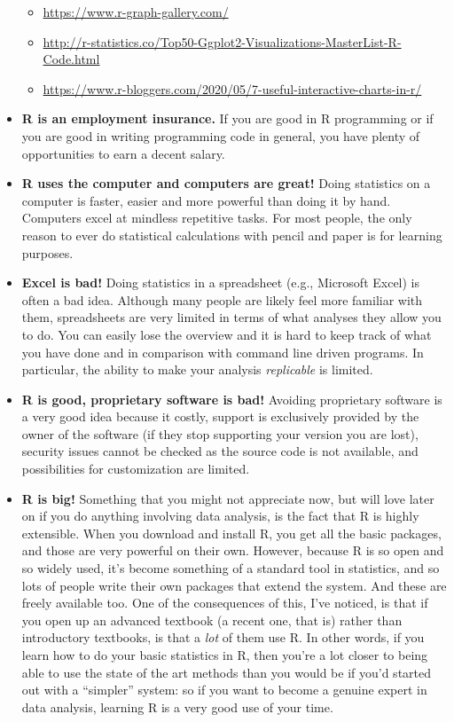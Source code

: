 \documentclass[
  12pt,
  oneside]{book}
\providecommand{\tightlist}{%
  \setlength{\itemsep}{0pt}\setlength{\parskip}{0pt}}
\theoremstyle{definition}
\theoremstyle{definition}
\theoremstyle{definition}
\theoremstyle{definition}
\theoremstyle{remark}
\begin{document}
\begin{itemize}
  \begin{itemize}
  \tightlist
  \item
    \url{https://www.r-graph-gallery.com/}
  \item
    \url{http://r-statistics.co/Top50-Ggplot2-Visualizations-MasterList-R-Code.html}
  \item
    \url{https://www.r-bloggers.com/2020/05/7-useful-interactive-charts-in-r/}
  \end{itemize}
\item
  \textbf{R is an employment insurance.} If you are good in R programming or if you are good in writing programming code in general, you have plenty of opportunities to earn a decent salary.
\item
  \textbf{R uses the computer and computers are great!} Doing statistics on a computer is faster, easier and more powerful than doing it by hand. Computers excel at mindless repetitive tasks. For most people, the only reason to ever do statistical calculations with pencil and paper is for learning purposes.
\item
  \textbf{Excel is bad!} Doing statistics in a spreadsheet (e.g., Microsoft Excel) is often a bad idea. Although many people are likely feel more familiar with them, spreadsheets are very limited in terms of what analyses they allow you to do. You can easily lose the overview and it is hard to keep track of what you have done and in comparison with command line driven programs. In particular, the ability to make your analysis \emph{replicable} is limited.
\item
  \textbf{R is good, proprietary software is bad!} Avoiding proprietary software is a very good idea because it costly, support is exclusively provided by the owner of the software (if they stop supporting your version you are lost), security issues cannot be checked as the source code is not available, and possibilities for customization are limited.
\item
  \textbf{R is big!} Something that you might not appreciate now, but will love later on if you do anything involving data analysis, is the fact that R is highly extensible. When you download and install R, you get all the basic packages, and those are very powerful on their own. However, because R is so open and so widely used, it's become something of a standard tool in statistics, and so lots of people write their own packages that extend the system. And these are freely available too. One of the consequences of this, I've noticed, is that if you open up an advanced textbook (a recent one, that is) rather than introductory textbooks, is that a \emph{lot} of them use R. In other words, if you learn how to do your basic statistics in R, then you're a lot closer to being able to use the state of the art methods than you would be if you'd started out with a ``simpler'' system: so if you want to become a genuine expert in data analysis, learning R is a very good use of your time.

\end{itemize}
\end{document}
